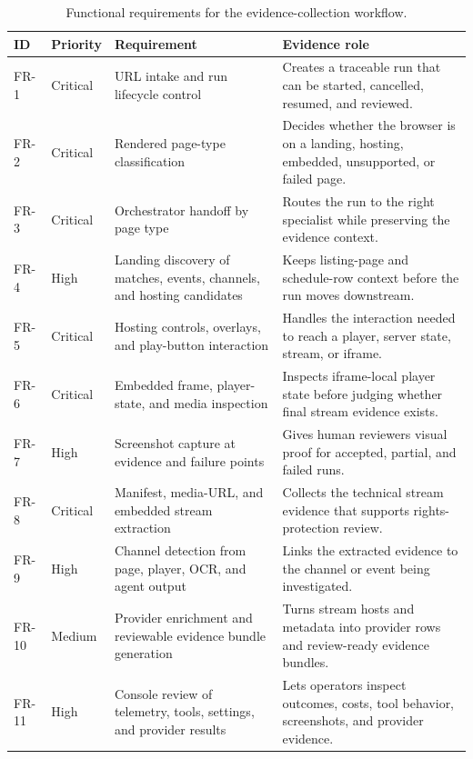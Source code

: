 \begin{table}[H]
\centering
\small
\setlength{\tabcolsep}{4pt}
\renewcommand{\arraystretch}{1.06}
\begin{tabularx}{\textwidth}{Q{1.05cm} Q{1.50cm} Y Y}
\toprule
{}
ID & Priority & Requirement & Evidence role \\
\midrule
FR-1 & Critical & URL intake and run lifecycle control &
Creates a traceable run that can be started, cancelled, resumed, and reviewed. \\
FR-2 & Critical & Rendered page-type classification &
Decides whether the browser is on a landing, hosting, embedded, unsupported, or failed page. \\
FR-3 & Critical & Orchestrator handoff by page type &
Routes the run to the right specialist while preserving the evidence context. \\
FR-4 & High & Landing discovery of matches, events, channels, and hosting candidates &
Keeps listing-page and schedule-row context before the run moves downstream. \\
FR-5 & Critical & Hosting controls, overlays, and play-button interaction &
Handles the interaction needed to reach a player, server state, stream, or iframe. \\
FR-6 & Critical & Embedded frame, player-state, and media inspection &
Inspects iframe-local player state before judging whether final stream evidence exists. \\
FR-7 & High & Screenshot capture at evidence and failure points &
Gives human reviewers visual proof for accepted, partial, and failed runs. \\
FR-8 & Critical & Manifest, media-URL, and embedded stream extraction &
Collects the technical stream evidence that supports rights-protection review. \\
FR-9 & High & Channel detection from page, player, OCR, and agent output &
Links the extracted evidence to the channel or event being investigated. \\
FR-10 & Medium & Provider enrichment and reviewable evidence bundle generation &
Turns stream hosts and metadata into provider rows and review-ready evidence bundles. \\
FR-11 & High & Console review of telemetry, tools, settings, and provider results &
Lets operators inspect outcomes, costs, tool behavior, screenshots, and provider evidence. \\
\bottomrule
\end{tabularx}
\caption{Functional requirements for the evidence-collection workflow.}\label{tab:fr-summary}
\end{table}

